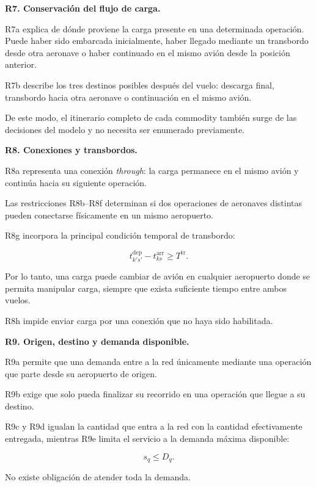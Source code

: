 \vspace{0.5em}
\noindent\textbf{R7. Conservación del flujo de carga.}

R7a explica de dónde proviene la carga presente en una determinada operación. Puede haber
sido embarcada inicialmente, haber llegado mediante un transbordo desde otra aeronave o haber
continuado en el mismo avión desde la posición anterior.

R7b describe los tres destinos posibles después del vuelo: descarga final, transbordo hacia
otra aeronave o continuación en el mismo avión.

De este modo, el itinerario completo de cada commodity también surge de las decisiones del
modelo y no necesita ser enumerado previamente.


\vspace{0.5em}
\noindent\textbf{R8. Conexiones y transbordos.}

R8a representa una conexión \textit{through}: la carga permanece en el mismo avión y continúa
hacia su siguiente operación.

Las restricciones R8b--R8f determinan si dos operaciones de aeronaves distintas pueden
conectarse físicamente en un mismo aeropuerto.

R8g incorpora la principal condición temporal de transbordo:

\[
t_{k's'}^{\mathrm{dep}}
-
t_{ks}^{\mathrm{arr}}
\geq
T^{\mathrm{tr}}.
\]

Por lo tanto, una carga puede cambiar de avión en cualquier aeropuerto donde se permita
manipular carga, siempre que exista suficiente tiempo entre ambos vuelos.

R8h impide enviar carga por una conexión que no haya sido habilitada.


\vspace{0.5em}
\noindent\textbf{R9. Origen, destino y demanda disponible.}

R9a permite que una demanda entre a la red únicamente mediante una operación que parte desde
su aeropuerto de origen.

R9b exige que solo pueda finalizar su recorrido en una operación que llegue a su destino.

R9c y R9d igualan la cantidad que entra a la red con la cantidad efectivamente entregada,
mientras R9e limita el servicio a la demanda máxima disponible:

\[
s_q\leq D_q.
\]

No existe obligación de atender toda la demanda.


